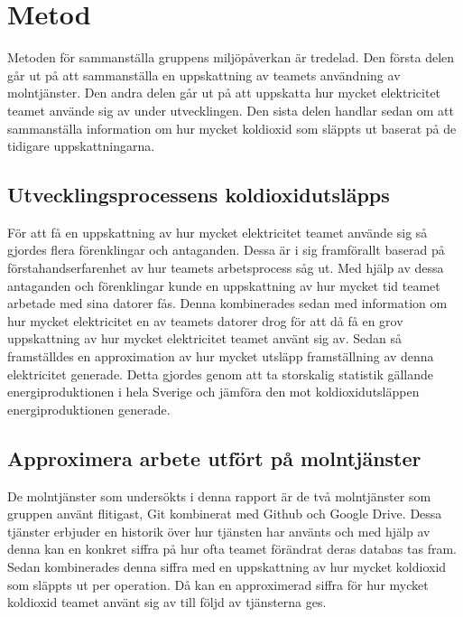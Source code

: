 \section{Metod}
\label{sec:joel_a-method}

Metoden för sammanställa gruppens miljöpåverkan är tredelad. Den första delen går ut på att sammanställa en uppskattning av teamets användning av molntjänster. Den andra delen går ut på att uppskatta hur mycket elektricitet teamet använde sig av under utvecklingen. Den sista delen handlar sedan om att sammanställa information om hur mycket koldioxid som släppts ut baserat på de tidigare uppskattningarna. 

\subsection{Utvecklingsprocessens koldioxidutsläpps}
För att få en uppskattning av hur mycket elektricitet teamet använde sig så gjordes flera förenklingar och antaganden. Dessa är i sig framförallt baserad på förstahandserfarenhet av hur teamets arbetsprocess såg ut. Med hjälp av dessa antaganden och förenklingar kunde en uppskattning av hur mycket tid teamet arbetade med sina datorer fås. Denna kombinerades sedan med information om hur mycket elektricitet en av teamets datorer drog för att då få en grov uppskattning av hur mycket elektricitet teamet använt sig av. Sedan så framställdes en approximation av hur mycket utsläpp framställning av denna elektricitet generade. Detta gjordes genom att ta storskalig statistik gällande energiproduktionen i hela Sverige och jämföra den mot koldioxidutsläppen energiproduktionen generade.

\subsection{Approximera arbete utfört på molntjänster}
\label{joel_a-method-cloud-nr}
De molntjänster som undersökts i denna rapport är de två molntjänster som gruppen använt flitigast, Git kombinerat med Github och Google Drive. Dessa tjänster erbjuder en historik över hur tjänsten har använts och med hjälp av denna kan en konkret siffra på hur ofta teamet förändrat deras databas tas fram. Sedan kombinerades denna siffra med en uppskattning av hur mycket koldioxid som släppts ut per operation. Då kan en approximerad siffra för hur mycket koldioxid teamet använt sig av till följd av tjänsterna ges. 

